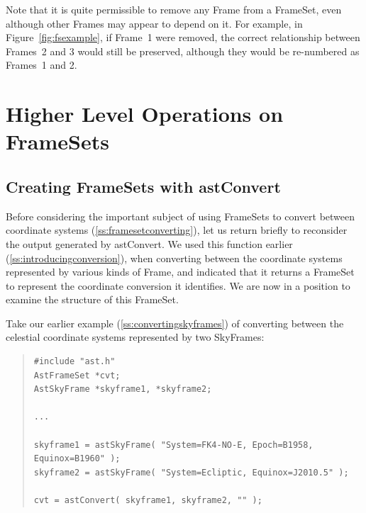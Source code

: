 \documentclass[twoside,11pt]{article}
\newcommand{\htmlref}[2]{#1}
\newcommand{\secref}[1]{\S\ref{#1}}
\renewcommand{\secref}[1]{\ref{#1}}
\begin{document}
Note that it is quite permissible to remove any Frame from a FrameSet,
even although other Frames may appear to depend on it. For example, in
Figure~\ref{fig:fsexample}, if Frame~1 were removed, the correct
relationship between Frames~2 and 3 would still be preserved, although
they would be re-numbered as Frames~1 and 2.

\cleardoublepage
%
\section{\label{ss:fshigher}Higher Level Operations on FrameSets}

\subsection{\label{ss:framesetsfromconvert}Creating FrameSets with astConvert}

Before considering the important subject of using FrameSets to convert
between coordinate systems (\secref{ss:framesetconverting}), let us
return briefly to reconsider the output generated by \htmlref{astConvert}{astConvert}. We
used this function earlier (\secref{ss:introducingconversion}), when
converting between the coordinate systems represented by various kinds
of \htmlref{Frame}{Frame}, and indicated that it returns a \htmlref{FrameSet}{FrameSet} to represent the
coordinate conversion it identifies. We are now in a position to
examine the structure of this FrameSet.

Take our earlier example (\secref{ss:convertingskyframes}) of
converting between the celestial coordinate systems represented by two
SkyFrames:

\begin{quote}
\small
\begin{verbatim}
#include "ast.h"
AstFrameSet *cvt;
AstSkyFrame *skyframe1, *skyframe2;

...

skyframe1 = astSkyFrame( "System=FK4-NO-E, Epoch=B1958, Equinox=B1960" );
skyframe2 = astSkyFrame( "System=Ecliptic, Equinox=J2010.5" );

cvt = astConvert( skyframe1, skyframe2, "" );
\end{verbatim}
\normalsize
\end{quote}
\end{document}
